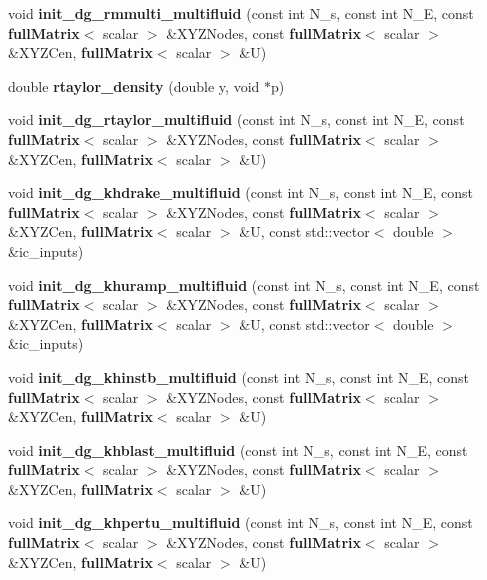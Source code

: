 \begin{DoxyCompactItemize}
\item 
void {\bfseries init\-\_\-dg\-\_\-rmmulti\-\_\-multifluid} (const int N\-\_\-s, const int N\-\_\-\-E, const {\bf full\-Matrix}$<$ scalar $>$ \&X\-Y\-Z\-Nodes, const {\bf full\-Matrix}$<$ scalar $>$ \&X\-Y\-Z\-Cen, {\bf full\-Matrix}$<$ scalar $>$ \&U)\label{init__cond_8cc_a7b4211d16331bc4d8459b472731fd546}

\item 
double {\bf rtaylor\-\_\-density} (double y, void $\ast$p)
\item 
void {\bfseries init\-\_\-dg\-\_\-rtaylor\-\_\-multifluid} (const int N\-\_\-s, const int N\-\_\-\-E, const {\bf full\-Matrix}$<$ scalar $>$ \&X\-Y\-Z\-Nodes, const {\bf full\-Matrix}$<$ scalar $>$ \&X\-Y\-Z\-Cen, {\bf full\-Matrix}$<$ scalar $>$ \&U)\label{init__cond_8cc_afc5b7edecc1e8295bba89fdd074d16e9}

\item 
void {\bfseries init\-\_\-dg\-\_\-khdrake\-\_\-multifluid} (const int N\-\_\-s, const int N\-\_\-\-E, const {\bf full\-Matrix}$<$ scalar $>$ \&X\-Y\-Z\-Nodes, const {\bf full\-Matrix}$<$ scalar $>$ \&X\-Y\-Z\-Cen, {\bf full\-Matrix}$<$ scalar $>$ \&U, const std\-::vector$<$ double $>$ \&ic\-\_\-inputs)\label{init__cond_8cc_aa44a032b419164079515f7e5bab4bbfa}

\item 
void {\bfseries init\-\_\-dg\-\_\-khuramp\-\_\-multifluid} (const int N\-\_\-s, const int N\-\_\-\-E, const {\bf full\-Matrix}$<$ scalar $>$ \&X\-Y\-Z\-Nodes, const {\bf full\-Matrix}$<$ scalar $>$ \&X\-Y\-Z\-Cen, {\bf full\-Matrix}$<$ scalar $>$ \&U, const std\-::vector$<$ double $>$ \&ic\-\_\-inputs)\label{init__cond_8cc_a9c1c34338e590c44f9473fde83e53931}

\item 
void {\bfseries init\-\_\-dg\-\_\-khinstb\-\_\-multifluid} (const int N\-\_\-s, const int N\-\_\-\-E, const {\bf full\-Matrix}$<$ scalar $>$ \&X\-Y\-Z\-Nodes, const {\bf full\-Matrix}$<$ scalar $>$ \&X\-Y\-Z\-Cen, {\bf full\-Matrix}$<$ scalar $>$ \&U)\label{init__cond_8cc_ad596ca3bcfb7867c46d282db29ba0302}

\item 
void {\bfseries init\-\_\-dg\-\_\-khblast\-\_\-multifluid} (const int N\-\_\-s, const int N\-\_\-\-E, const {\bf full\-Matrix}$<$ scalar $>$ \&X\-Y\-Z\-Nodes, const {\bf full\-Matrix}$<$ scalar $>$ \&X\-Y\-Z\-Cen, {\bf full\-Matrix}$<$ scalar $>$ \&U)\label{init__cond_8cc_ab090d742ad67de29d5c253bc7e1dc754}

\item 
void {\bfseries init\-\_\-dg\-\_\-khpertu\-\_\-multifluid} (const int N\-\_\-s, const int N\-\_\-\-E, const {\bf full\-Matrix}$<$ scalar $>$ \&X\-Y\-Z\-Nodes, const {\bf full\-Matrix}$<$ scalar $>$ \&X\-Y\-Z\-Cen, {\bf full\-Matrix}$<$ scalar $>$ \&U)\label{init__cond_8cc_a373b5978360a1fbbafb90fa762821ce2}


\end{DoxyCompactItemize}

